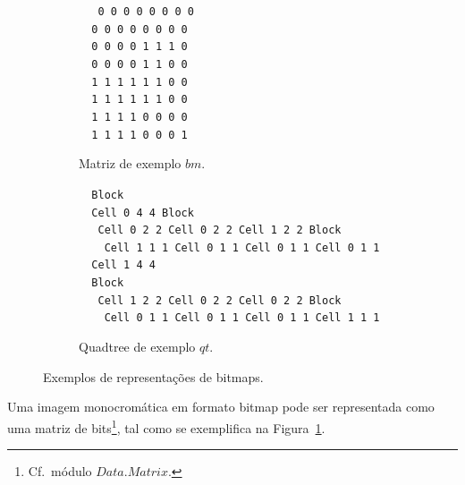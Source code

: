\documentclass[a4paper]{article}
\newcommand{\Conid}[1]{\mathit{#1}}
\newcommand{\Varid}[1]{\mathit{#1}}
\begin{document}
\begin{figure}
\begin{subfigure}{0.3\textwidth}
\begin{tabbing}\tt
~~0~0~0~0~0~0~0~0~\\
\tt ~~0~0~0~0~0~0~0~0~\\
\tt ~~0~0~0~0~1~1~1~0~\\
\tt ~~0~0~0~0~1~1~0~0~\\
\tt ~~1~1~1~1~1~1~0~0~\\
\tt ~~1~1~1~1~1~1~0~0~\\
\tt ~~1~1~1~1~0~0~0~0~\\
\tt ~~1~1~1~1~0~0~0~1~
\end{tabbing}
\caption{Matriz de exemplo \ensuremath{\Varid{bm}}.}
\label{fig:bm}
\end{subfigure}
\begin{subfigure}{0.7\textwidth}
\begin{tabbing}\tt
~Block\\
\tt ~~Cell~0~4~4~Block\\
\tt ~~~Cell~0~2~2~Cell~0~2~2~Cell~1~2~2~Block\\
\tt ~~~~Cell~1~1~1~Cell~0~1~1~Cell~0~1~1~Cell~0~1~1\\
\tt ~~Cell~1~4~4\\
\tt ~~Block\\
\tt ~~~Cell~1~2~2~Cell~0~2~2~Cell~0~2~2~Block\\
\tt ~~~~Cell~0~1~1~Cell~0~1~1~Cell~0~1~1~Cell~1~1~1
\end{tabbing}
\caption{Quadtree de exemplo \ensuremath{\Varid{qt}}.}
\label{fig:qt}
\end{subfigure}
\caption{Exemplos de representações de bitmaps.}
\end{figure}

Uma imagem monocromática em formato bitmap pode ser representada como uma
matriz de bits\footnote{Cf.\ módulo \href{https://hackage.haskell.org/package/matrix}{\ensuremath{\Conid{\Conid{Data}.Matrix}}}.},
tal como se exemplifica na Figura~\ref{fig:bm}.
\end{document}
